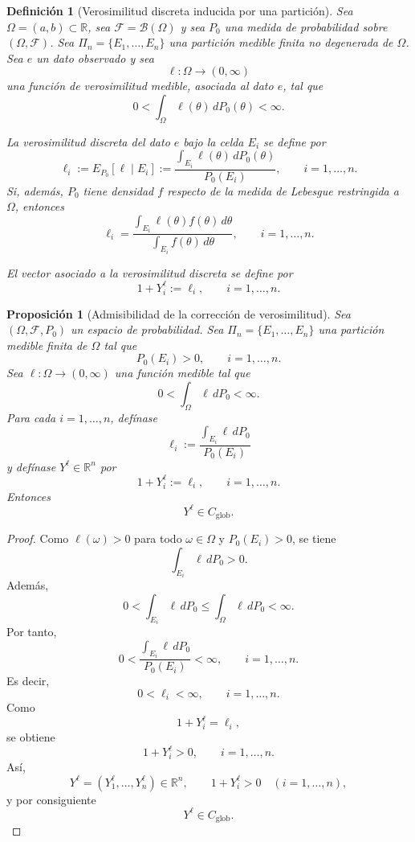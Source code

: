 ﻿\documentclass[12pt]{article}
\newtheorem{definicion}{Definición}[section]
\newtheorem{proposicion}{Proposición}[section]
\begin{document}
\begin{definicion}[Verosimilitud discreta inducida por una partición]\label{def:verosimilitud_global}
Sea $\Omega=(a,b)\subset\mathbb R$, sea $\mathcal F=\mathcal B(\Omega)$ y sea $P_0$ una medida de probabilidad sobre $(\Omega,\mathcal F)$. Sea $\Pi_n=\{E_1,\dots,E_n\}$ una partición medible finita no degenerada de $\Omega$. Sea $e$ un dato observado y sea
\[
\ell:\Omega\to(0,\infty)
\]
una función de verosimilitud medible, asociada al dato $e$, tal que
\[
0<\int_\Omega \ell(\theta)\,dP_0(\theta)<\infty.
\]

La \emph{verosimilitud discreta del dato $e$ bajo la celda $E_i$} se define por
\[
\ell_i
:=E_{P_0}[\ell\mid E_i]
:=
\frac{\displaystyle\int_{E_i}\ell(\theta)\,dP_0(\theta)}{P_0(E_i)},
\qquad i=1,\dots,n.
\]
Si, además, $P_0$ tiene densidad $f$ respecto de la medida de Lebesgue restringida a $\Omega$, entonces
\[
\ell_i
=
\frac{\displaystyle\int_{E_i}\ell(\theta)f(\theta)\,d\theta}{\displaystyle\int_{E_i}f(\theta)\,d\theta},
\qquad i=1,\dots,n.
\]

El vector asociado a la verosimilitud discreta se define por
\[
1+Y_i^\ell:=\ell_i,
\qquad i=1,\dots,n.
\]
\end{definicion}

\begin{proposicion}[Admisibilidad de la corrección de verosimilitud]\label{prop:admisibilidad_verosimilitud_global}
Sea $(\Omega,\mathcal F,P_0)$ un espacio de probabilidad. Sea $\Pi_n=\{E_1,\dots,E_n\}$ una partición medible finita de $\Omega$ tal que
\[
P_0(E_i)>0,
\qquad i=1,\dots,n.
\]
Sea $\ell:\Omega\to(0,\infty)$ una función medible tal que
\[
0<\int_\Omega \ell\,dP_0<\infty.
\]
Para cada $i=1,\dots,n$, defínase
\[
\ell_i:=\frac{\displaystyle\int_{E_i}\ell\,dP_0}{P_0(E_i)}
\]
y defínase $Y^\ell\in\mathbb R^n$ por
\[
1+Y_i^\ell:=\ell_i,
\qquad i=1,\dots,n.
\]
Entonces
\[
Y^\ell\in C_{\mathrm{glob}}.
\]
\end{proposicion}

\begin{proof}
Como $\ell(\omega)>0$ para todo $\omega\in\Omega$ y $P_0(E_i)>0$, se tiene
\[
\int_{E_i}\ell\,dP_0>0.
\]
Además,
\[
0<\int_{E_i}\ell\,dP_0
\le
\int_\Omega \ell\,dP_0
<\infty.
\]
Por tanto,
\[
0<
\frac{\displaystyle\int_{E_i}\ell\,dP_0}{P_0(E_i)}
<\infty,
\qquad i=1,\dots,n.
\]
Es decir,
\[
0<\ell_i<\infty,
\qquad i=1,\dots,n.
\]
Como
\[
1+Y_i^\ell=\ell_i,
\]
se obtiene
\[
1+Y_i^\ell>0,
\qquad i=1,\dots,n.
\]
Así,
\[
Y^\ell=(Y_1^\ell,\dots,Y_n^\ell)\in\mathbb R^n,
\qquad
1+Y_i^\ell>0\quad (i=1,\dots,n),
\]
y por consiguiente
\[
Y^\ell\in C_{\mathrm{glob}}.
\]
\end{proof}
\end{document}
